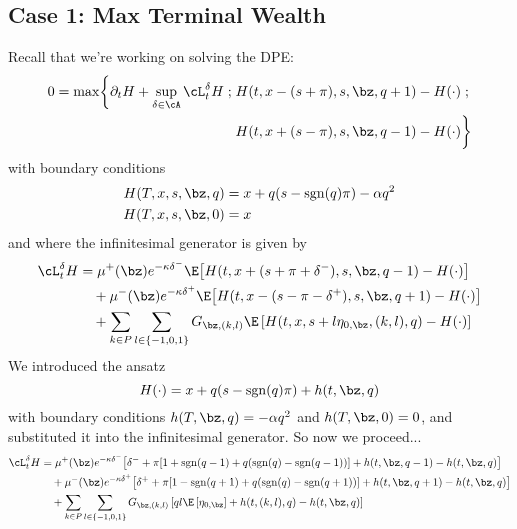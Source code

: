 \documentclass[12pt]{article}
\begin{document}
\subsection*{Case 1: Max Terminal Wealth}
Recall that we're working on solving the DPE:
\begin{equation}
\label{eq:DPEmaxprofit}
\begin{split}
0 = \max \biggl\lbrace \partial_t H + \sup \limits_{\delta \in \cA} \cL^{\delta}_t H \; ; \; & H(t,x-(s+\pi), s, \bz, q+1) - H(\cdot) \; ; \\
&  H(t,x+(s-\pi), s, \bz, q-1) - H(\cdot) \biggr\rbrace
\end{split}
\end{equation}
with boundary conditions
\begin{subequations}
\begin{align}
H(T, x, s, \bz, q) & = x + q(s - \mathrm{sgn}(q)\pi) - \alpha q^2 \\
H(T, x, s, \bz, 0) & = x
\end{align}
\end{subequations}
and where the infinitesimal generator is given by
\begin{equation}
\label{eq:infgen}
\begin{split}
\cL^{\delta}_t H & = \mu^+(\bz) e^{ -\kappa \delta^{-}} \E \bigl[ H(t,x+(s+\pi+\delta^-),s,\bz,q-1) - H(\cdot) \bigr] \\
& \quad + \mu^-(\bz) e^{ -\kappa \delta^{+}} \E \bigl[ H(t,x-(s-\pi-\delta^+),s,\bz,q+1) - H(\cdot) \bigr] \\
& \quad + \sum_{k\in P} \sum_{l \in \{-1,0,1\}} G_{\bz,(k,l)} \E \left[ H(t,x,s+l\eta_{0,\bz},(k,l),q) - H(\cdot) \right] 
\end{split}
\end{equation}
We introduced the ansatz
\begin{equation}
\label{eq:ansatzHcase1}
H(\cdot) = x + q(s - \mathrm{sgn}(q)\pi) + h(t,\bz,q)
\end{equation} 
with boundary conditions $h(T, \bz, q)  = - \alpha q^2$ and $h(T, \bz, 0)  = 0$, and substituted it into the infinitesimal generator. So now we proceed...
\begin{align*}
\cL^{\delta}_t H & = \mu^+(\bz) e^{ -\kappa \delta^{-}} \bigl[ \delta^- + \pi [ 1 + \mathrm{sgn}(q-1) + q(\mathrm{sgn}(q) - \mathrm{sgn}(q-1) ) ] + h(t,\bz,q-1) - h(t,\bz,q) \bigr] \\
& \quad + \mu^-(\bz) e^{ -\kappa \delta^{+}} \bigl[ \delta^+ + \pi [ 1 - \mathrm{sgn}(q+1) + q(\mathrm{sgn}(q) - \mathrm{sgn}(q+1) ) ] + h(t,\bz,q+1) - h(t,\bz,q) \bigr] \\
& \quad + \sum_{k\in P} \sum_{l \in \{-1,0,1\}} G_{\bz,(k,l)} \left[ ql \E \left[ \eta_{0,\bz} \right] + h(t,(k,l),q) - h(t,\bz,q) \right] 
\end{align*}
\end{document}

